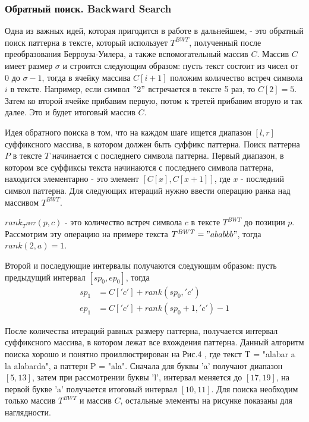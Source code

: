 \documentclass[a4paper,12pt]{article}
\begin{document}
\subsubsection{Обратный поиск. Backward Search}
Одна из важных идей, которая пригодится в работе в дальнейшем, - это обратный поиск \cite{grabowski2017fm} паттерна в тексте, который использует $T^{BWT}$, полученный после преобразования Берроуза-Уилера, а также вспомогательный массив $C$. Массив $C$ имеет размер $\sigma$ и строится следующим образом: пусть текст состоит из чисел от 0 до $\sigma-1$, тогда в ячейку массива $C[i+1]$ положим количество встреч символа $i$ в тексте. Например, если символ $"2"$ встречается в тексте 5 раз, то $C[2]=5$. Затем ко второй ячейке прибавим первую, потом к третей прибавим вторую и так далее. Это и будет итоговый массив $C$.

Идея обратного поиска в том, что на каждом шаге ищется диапазон $[l,r]$ суффиксного массива, в котором должен быть суффикс паттерна. Поиск паттерна $P$ в тексте $T$ начинается с последнего символа паттерна. Первый диапазон, в котором все суффиксы текста начинаются с последнего символа паттерна, находится элементарно - это элемент $[C[x], C[x+1]]$, где $x$ - последний символ паттерна. Для следующих итераций нужно ввести операцию ранка над массивом $T^{BWT}$.

$rank_{T^{BWT}}(p, c)$ - это количество встреч символа $c$ в тексте $T^{BWT}$ до позиции $p$. Рассмотрим эту операцию на примере текста $T^{BWT}="ababbb"$, тогда $rank(2, a)=1$.

Второй и последующие интервалы получаются следующим образом: пусть предыдущий интервал $[sp_0, ep_0]$, тогда
\begin{align*}
sp_1 & = C['c'] + rank(sp_0, 'c')\\
ep_1 & = C['c'] + rank(sp_0 + 1, 'c') - 1
\end{align*}

После количества итераций равных размеру паттерна, получается интервал суффиксного массива, в котором лежат все вхождения паттерна. Данный алгоритм поиска хорошо и понятно проиллюстрирован на Рис.4 \cite{navarro2007compressed}, где текст T = "alabar a la alabarda", а паттерн P = "ala". Сначала для буквы 'a' получают диапазон $[5, 13]$, затем при рассмотрении буквы 'l', интервал меняется до $[17, 19]$, на первой букве 'a' получается итоговый интервал $[10,11]$. Для поиска необходим только массив $T^{BWT}$ и массив $C$, остальные элементы на рисунке показаны для наглядности.
\end{document}
